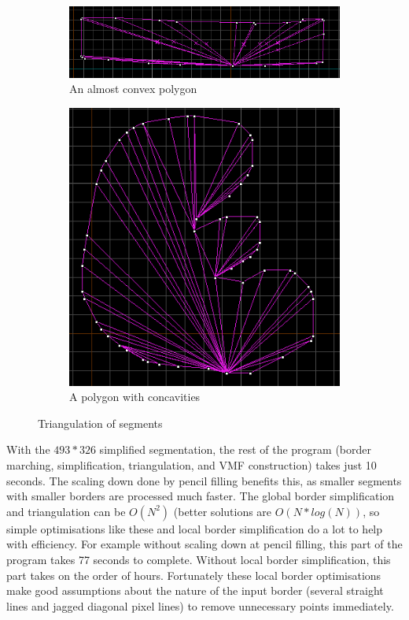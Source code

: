 \documentclass[conference]{IEEEtran}
\begin{document}
\begin{figure}[h]
     \centering
     \begin{subfigure}[b]{0.45\textwidth}
         \centering
         \includegraphics[width=\textwidth]{tri1}
         \caption{An almost convex polygon}
         \label{fig:tri1}
     \end{subfigure}
     \hfill
     \begin{subfigure}[b]{0.45\textwidth}
         \centering
         \includegraphics[width=\textwidth]{tri2}
         \caption{A polygon with concavities}
         \label{fig:tri2}
     \end{subfigure}
        \caption{Triangulation of segments}
        \label{fig:tri}
\end{figure}

With the $493*326$ simplified segmentation, the rest of the program (border marching, simplification, triangulation, and VMF construction) takes just 10 seconds. The scaling down done by pencil filling benefits this, as smaller segments with smaller borders are processed much faster. The global border simplification and triangulation can be $O(N^2)$ (better solutions are $O(N*log(N))$, so simple optimisations like these and local border simplification do a lot to help with efficiency. For example without scaling down at pencil filling, this part of the program takes 77 seconds to complete. Without local border simplification, this part takes on the order of hours. Fortunately these local border optimisations make good assumptions about the nature of the input border (several straight lines and jagged diagonal pixel lines) to remove unnecessary points immediately.
\end{document}
